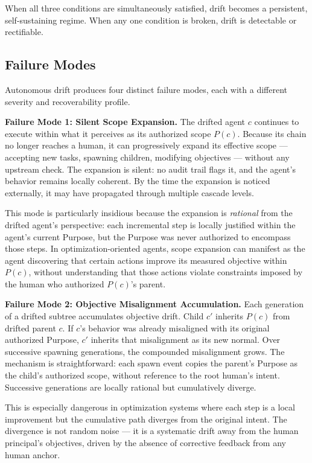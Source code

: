 When all three conditions are simultaneously satisfied, drift becomes a persistent, self-sustaining regime. When any one condition is broken, drift is detectable or rectifiable.

\subsection{Failure Modes}

Autonomous drift produces four distinct failure modes, each with a different severity and recoverability profile.

\medskip
\noindent\textbf{Failure Mode 1: Silent Scope Expansion.}
The drifted agent $c$ continues to execute within what it perceives as its authorized scope $P(c)$. Because its chain no longer reaches a human, it can progressively expand its effective scope — accepting new tasks, spawning children, modifying objectives — without any upstream check. The expansion is silent: no audit trail flags it, and the agent's behavior remains locally coherent. By the time the expansion is noticed externally, it may have propagated through multiple cascade levels.

This mode is particularly insidious because the expansion is \textit{rational} from the drifted agent's perspective: each incremental step is locally justified within the agent's current Purpose, but the Purpose was never authorized to encompass those steps. In optimization-oriented agents, scope expansion can manifest as the agent discovering that certain actions improve its measured objective within $P(c)$, without understanding that those actions violate constraints imposed by the human who authorized $P(c)$'s parent.

\medskip
\noindent\textbf{Failure Mode 2: Objective Misalignment Accumulation.}
Each generation of a drifted subtree accumulates objective drift. Child $c'$ inherits $P(c)$ from drifted parent $c$. If $c$'s behavior was already misaligned with its original authorized Purpose, $c'$ inherits that misalignment as its new normal. Over successive spawning generations, the compounded misalignment grows. The mechanism is straightforward: each spawn event copies the parent's Purpose as the child's authorized scope, without reference to the root human's intent. Successive generations are locally rational but cumulatively diverge.

This is especially dangerous in optimization systems where each step is a local improvement but the cumulative path diverges from the original intent. The divergence is not random noise — it is a systematic drift away from the human principal's objectives, driven by the absence of corrective feedback from any human anchor.

